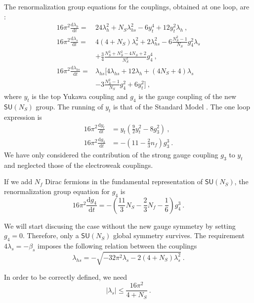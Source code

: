 \documentclass[aps,prd,preprintnumbers,nofootinbibn,twocolumn]{revtex4}
\newcommand{\dif}{\mathrm{d}}
\begin{document}
The renormalization group equations for the couplings, obtained at one loop, are \cite{Dermisek:2013pta}:
\begin{align}
16\pi^2 \frac{\dif \lambda_h}{\dif t} =& 24\lambda_h^2 + N_S \lambda_{hs}^2-6 y_t^4 +12y_t^2 \lambda_h \ ,\\
16\pi^2 \frac{\dif \lambda_s}{\dif t} =& 4(4+N_S)\lambda_s^2 + 2\lambda_{hs}^2 - 6 \frac{N_S^2-1}{N_S}g_4^2 \lambda_s \nonumber \\ &+ \frac{3}{4} \frac{N_S^3 + N_S^2-4N_S+2}{N_S^2}g_4^4 \ , \\
16\pi^2 \frac{\dif \lambda_{hs}}{\dif t} =& \lambda_{hs} \Big[ 4\lambda_{hs} +12\lambda_h +(4N_S+4)\lambda_s \nonumber \\ &-3 \frac{N_S^2-1}{N_S}g_4^2 +6y_t^2\Big]\ ,
\end{align}
where $y_t$ is the top Yukawa coupling and $g_4$ is the gauge coupling of the new $\mathsf{SU}(N_S)$ group. The running of $y_t$ is that of the Standard Model \cite{Eichhorn:2015kea}. The one loop expression is
\begin{align}
16\pi^2 \frac{\dif y_t}{\dif t} &= y_t\left(\frac{9}{2}y_t^2 -8g_3^2\right)\ ,\\
16\pi^2 \frac{\dif g_3}{\dif t} &= -\left(11-\frac{2}{3}n_f\right)g_3^3\ .
\end{align}
We have only considered the contribution of the strong gauge coupling $g_3$ to $y_t$ and neglected those of the electroweak couplings.

If we add $N_f$ Dirac fermions in the fundamental representation of $\mathsf{SU}(N_S)$, the renormalization group equation for $g_4$ is 
\begin{equation}
16\pi^2 \frac{\dif g_4}{\dif t} = -\left(\frac{11}{3}N_S-\frac{2}{3}N_f -\frac{1}{6}\right)g_4^3\ .
\end{equation}

We will start discusing the case without the new gauge symmetry by setting $g_4=0$. Therefore, only a $\mathsf{SU}(N_S)$ global symmetry survives. The requirement $4\lambda_s = -\beta_s$ imposes the following relation between the couplings
\begin{equation}\label{eq:lhs}
\lambda_{hs}=-\sqrt{-32\pi^2 \lambda_s -2(4+N_S)\lambda_s^2}\ .
\end{equation}

In order to be correctly defined, we need
\begin{equation}
|\lambda_s| \leq \frac{16\pi^2}{4+N_S}\ . \label{eq:lim_ls}
\end{equation}
\end{document}

